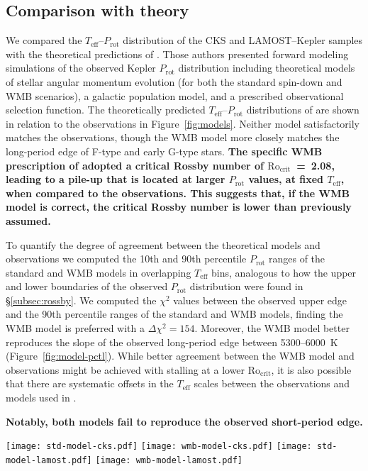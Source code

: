 \documentclass[linenumbers,tighten,trackchanges,twocolumn]{aastex631}
\newcommand{\rocrit}{$\mathrm{Ro_{crit}}$\xspace}
\newcommand{\teff}{\ensuremath{T_{\mathrm{eff}}}\xspace}
\newcommand{\prot}{\ensuremath{P_\mathrm{rot}}\xspace}
\begin{document}
\subsection{Comparison with theory}
\label{subsec:models}

We compared the \teff--\prot distribution of the CKS and LAMOST--Kepler samples with the theoretical predictions of \citet{vanSaders2019}. Those authors presented forward modeling simulations of the observed Kepler \prot distribution including theoretical models of stellar angular momentum evolution (for both the standard spin-down and WMB scenarios), a galactic population model, and a prescribed observational selection function. The theoretically predicted \teff--\prot distributions of \citet{vanSaders2019} are shown in relation to the observations in Figure~\ref{fig:models}. Neither model satisfactorily matches the observations, though the WMB model more closely matches the long-period edge of F-type and early G-type stars. \textbf{The specific WMB prescription of \citet{vanSaders2019} adopted a critical Rossby number of \rocrit~=~2.08, leading to a pile-up that is located at larger \prot values, at fixed \teff, when compared to the observations. This suggests that, if the WMB model is correct, the critical Rossby number is lower than previously assumed.} 

To quantify the degree of agreement between the theoretical models and observations we computed the 10th and 90th percentile \prot ranges of the standard and WMB models in overlapping \teff bins, analogous to how the upper and lower boundaries of the observed \prot distribution were found in \S\ref{subsec:rossby}. We computed the $\chi^2$ values between the observed upper edge and the 90th percentile ranges of the standard and WMB models, finding the WMB model is preferred with a $\Delta \chi^2 = 154$. Moreover, the WMB model better reproduces the slope of the observed long-period edge between 5300--6000~K (Figure~\ref{fig:model-pctl}). While better agreement between the WMB model and observations might be achieved with stalling at a lower \rocrit, it is also possible that there are systematic offsets in the \teff scales between the observations and models used in \citet{vanSaders2019}. 

\textbf{Notably, both models fail to reproduce the observed short-period edge.} 

\begin{figure*}
    \centering
    \texttt{[image: std-model-cks.pdf]}
    \texttt{[image: wmb-model-cks.pdf]}
    \texttt{[image: std-model-lamost.pdf]}
    \texttt{[image: wmb-model-lamost.pdf]}
    \caption{The \teff-\prot plane for the CKS sample (top panels) and LAMOST sample (bottom panels) in comparison to the standard and WMB models presented in \citet{vanSaders2019}.}
    \label{fig:models}
\end{figure*}
\end{document}
